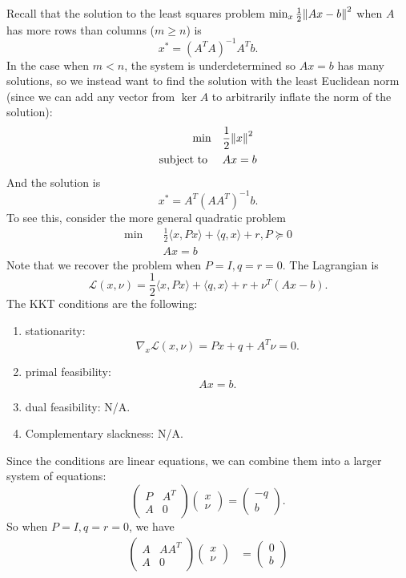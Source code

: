 \documentclass[class=article,crop=false]{standalone}
\begin{document}
\begin{eg}
	Recall that the solution to the least squares problem $ \min_x \frac{1}{2} {\left\lVert{ Ax-b}\right\rVert}^2 $ when $ A$ has more rows than columns ($ m\geq n$) is
 \[
	 x^* = \left( A^{T}A \right) ^{-1} A^{T}b
.\]
In the case when $ m<n$, the system is underdetermined so $ Ax=b$ has many solutions, so we instead want to find the solution with the least Euclidean norm (since we can add any vector from $ \ker A$ to arbitrarily inflate the norm of the solution):
\begin{align*}
\min\quad &\frac{1}{2}{\left\lVert{ x}\right\rVert}^2  \\
\text{subject to } \quad &Ax=b
\end{align*}
And the solution is
\[
	x^*  = A^{T}\left( AA^{T} \right) ^{-1} b
.\] 
To see this, consider the more general quadratic problem
\begin{align*}
	\min\quad & \frac{1}{2} \langle x,Px \rangle + \langle q,x \rangle+ r, P\succeq 0  \\
		  &Ax = b
\end{align*}
Note that we recover the problem when $ P=I, q=r=0$.
The Lagrangian is
\[
	\mathscr{L}(x,\nu) = \frac{1}{2} \langle x,Px \rangle+ \langle q,x \rangle+ r+ \nu^{T}(Ax-b)
.\] 
The KKT conditions are the following:
\begin{enumerate}[label=(\arabic*)]
	\item stationarity:
		\[
			\nabla _x \mathscr{L}(x,\nu) = Px+q+A^{T}\nu = 0
		.\] 
	\item primal feasibility:
		\[
		Ax=b
		.\] 
	\item dual feasibility: N/A.
	\item Complementary slackness: N/A.
\end{enumerate}
Since the conditions are linear equations, we can combine them into a larger system of equations:
\[
	\begin{pmatrix} P&A^{T}\\A&0 \end{pmatrix} \begin{pmatrix} x\\ \nu \end{pmatrix} = \begin{pmatrix} -q\\ b \end{pmatrix}  
.\]
So when $ P=I,q=r=0$, we have
\begin{align*}
	\begin{pmatrix} A&A A^{T} \\ A&0 \end{pmatrix} \begin{pmatrix} x\\ \nu \end{pmatrix}&= \begin{pmatrix} 0\\ b \end{pmatrix}  \\

\end{align*}
\end{eg}
\end{document}
